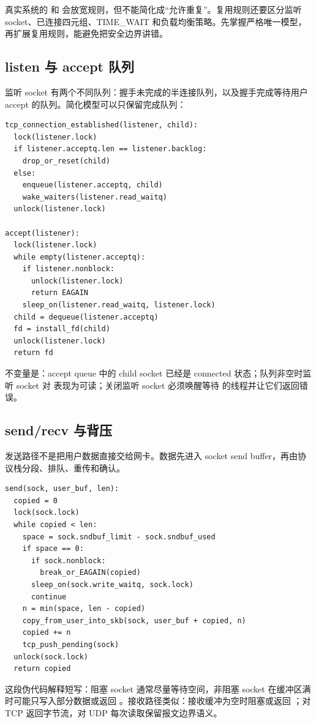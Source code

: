 真实系统的  和  会放宽规则，但不能简化成“允许重复”。复用规则还要区分监听 socket、已连接四元组、TIME\_WAIT 和负载均衡策略。先掌握严格唯一模型，再扩展复用规则，能避免把安全边界讲错。

\subsection{listen 与 accept 队列}

监听 socket 有两个不同队列：握手未完成的半连接队列，以及握手完成等待用户 accept 的队列。简化模型可以只保留完成队列：

\begin{lstlisting}
tcp_connection_established(listener, child):
  lock(listener.lock)
  if listener.acceptq.len == listener.backlog:
    drop_or_reset(child)
  else:
    enqueue(listener.acceptq, child)
    wake_waiters(listener.read_waitq)
  unlock(listener.lock)

accept(listener):
  lock(listener.lock)
  while empty(listener.acceptq):
    if listener.nonblock:
      unlock(listener.lock)
      return EAGAIN
    sleep_on(listener.read_waitq, listener.lock)
  child = dequeue(listener.acceptq)
  fd = install_fd(child)
  unlock(listener.lock)
  return fd
\end{lstlisting}

不变量是：accept queue 中的 child socket 已经是 connected 状态；队列非空时监听 socket 对  表现为可读；关闭监听 socket 必须唤醒等待  的线程并让它们返回错误。

\subsection{send/recv 与背压}

发送路径不是把用户数据直接交给网卡。数据先进入 socket send buffer，再由协议栈分段、排队、重传和确认。

\begin{lstlisting}
send(sock, user_buf, len):
  copied = 0
  lock(sock.lock)
  while copied < len:
    space = sock.sndbuf_limit - sock.sndbuf_used
    if space == 0:
      if sock.nonblock:
        break_or_EAGAIN(copied)
      sleep_on(sock.write_waitq, sock.lock)
      continue
    n = min(space, len - copied)
    copy_from_user_into_skb(sock, user_buf + copied, n)
    copied += n
    tcp_push_pending(sock)
  unlock(sock.lock)
  return copied
\end{lstlisting}

这段伪代码解释短写：阻塞 socket 通常尽量等待空间，非阻塞 socket 在缓冲区满时可能只写入部分数据或返回 。接收路径类似：接收缓冲为空时阻塞或返回 ；对 TCP 返回字节流，对 UDP 每次读取保留报文边界语义。

